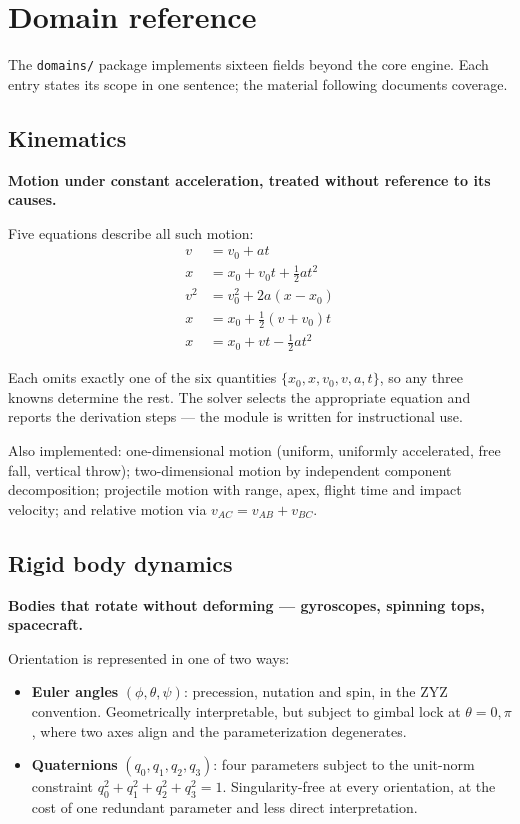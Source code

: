 \documentclass[11pt,a4paper]{article}
\newcommand{\code}[1]{\texttt{#1}}
\begin{document}
\section{Domain reference}
\label{sec:domains}

The \code{domains/} package implements sixteen fields beyond the core engine. Each entry states its
scope in one sentence; the material following documents coverage.

\subsection{Kinematics}

\textbf{Motion under constant acceleration, treated without reference to its causes.}

Five equations describe all such motion:
\begin{align}
v   &= v_0 + at \\
x   &= x_0 + v_0 t + \tfrac{1}{2}at^2 \\
v^2 &= v_0^2 + 2a(x - x_0) \\
x   &= x_0 + \tfrac{1}{2}(v + v_0)t \\
x   &= x_0 + vt - \tfrac{1}{2}at^2
\end{align}

Each omits exactly one of the six quantities $\{x_0, x, v_0, v, a, t\}$, so any three knowns
determine the rest. The solver selects the appropriate equation and reports the derivation steps ---
the module is written for instructional use.

Also implemented: one-dimensional motion (uniform, uniformly accelerated, free fall, vertical throw);
two-dimensional motion by independent component decomposition; projectile motion with range, apex,
flight time and impact velocity; and relative motion via $v_{AC} = v_{AB} + v_{BC}$.

\subsection{Rigid body dynamics}
\label{sec:rigidbody}

\textbf{Bodies that rotate without deforming --- gyroscopes, spinning tops, spacecraft.}

Orientation is represented in one of two ways:

\begin{itemize}[leftmargin=1.4em,itemsep=0.3em]
  \item \textbf{Euler angles} $(\phi, \theta, \psi)$: precession, nutation and spin, in the ZYZ
        convention. Geometrically interpretable, but subject to gimbal lock at $\theta = 0, \pi$,
        where two axes align and the parameterization degenerates.
  \item \textbf{Quaternions} $(q_0, q_1, q_2, q_3)$: four parameters subject to the unit-norm
        constraint $q_0^2 + q_1^2 + q_2^2 + q_3^2 = 1$. Singularity-free at every orientation, at the
        cost of one redundant parameter and less direct interpretation.
\end{itemize}
\end{document}
